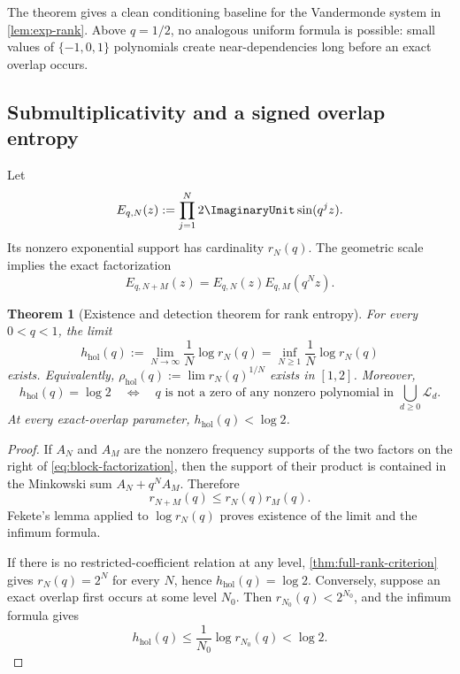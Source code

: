 \documentclass[11pt]{article}
\numberwithin{equation}{section}
\newtheorem{theorem}{Theorem}[section]
\theoremstyle{definition}
\theoremstyle{remark}
\begin{document}
The theorem gives a clean conditioning baseline for the Vandermonde system in
\cref{lem:exp-rank}.  Above $q=1/2$, no analogous uniform formula is possible:
small values of $\{-1,0,1\}$ polynomials create near-dependencies long before
an exact overlap occurs.

\subsection{Submultiplicativity and a signed overlap entropy}

Let
\begin{equation}
 E_{q,N}(z):=\prod_{j=1}^{N}2\ImaginaryUnit\sin(q^jz).
 \label{eq:EqN}
\end{equation}
Its nonzero exponential support has cardinality $r_N(q)$.  The geometric scale
implies the exact factorization
\begin{equation}
 E_{q,N+M}(z)=E_{q,N}(z)E_{q,M}(q^Nz).
 \label{eq:block-factorization}
\end{equation}

\begin{theorem}[Existence and detection theorem for rank entropy]
\label{thm:rank-entropy}
For every $0<q<1$, the limit
\begin{equation}
 h_{\mathrm{hol}}(q):=
 \lim_{N\to\infty}\frac{1}{N}\log r_N(q)
 =\inf_{N\ge1}\frac{1}{N}\log r_N(q)
 \label{eq:holonomic-entropy}
\end{equation}
exists.  Equivalently,
$\rho_{\mathrm{hol}}(q):=\lim r_N(q)^{1/N}$ exists in $[1,2]$.
Moreover,
\begin{equation}
 \boxed{
 h_{\mathrm{hol}}(q)=\log2
 \quad\Longleftrightarrow\quad
 q\text{ is not a zero of any nonzero polynomial in }
 \bigcup_{d\ge0}\mathscr L_d.}
 \label{eq:entropy-detects-overlap}
\end{equation}
At every exact-overlap parameter, $h_{\mathrm{hol}}(q)<\log2$.
\end{theorem}
\begin{proof}
If $A_N$ and $A_M$ are the nonzero frequency supports of the two factors on
the right of \eqref{eq:block-factorization}, then the support of their product
is contained in the Minkowski sum $A_N+q^NA_M$.  Therefore
\begin{equation}
 r_{N+M}(q)\le r_N(q)r_M(q).
 \label{eq:rank-submultiplicative}
\end{equation}
Fekete's lemma applied to $\log r_N(q)$ proves existence of the limit and the
infimum formula.

If there is no restricted-coefficient relation at any level,
\cref{thm:full-rank-criterion} gives $r_N(q)=2^N$ for every $N$, hence
$h_{\mathrm{hol}}(q)=\log2$.  Conversely, suppose an exact overlap first occurs
at some level $N_0$.  Then $r_{N_0}(q)<2^{N_0}$, and the infimum formula gives
\[
 h_{\mathrm{hol}}(q)
 \le\frac{1}{N_0}\log r_{N_0}(q)<\log2.
\]
\end{proof}
\end{document}
